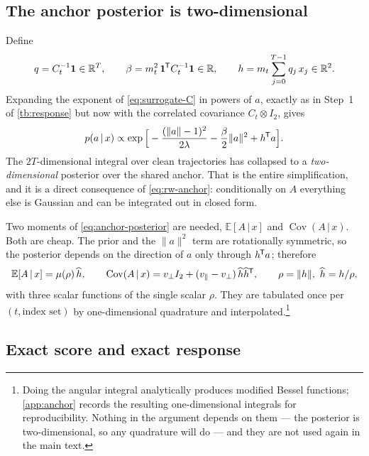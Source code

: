 \documentclass[11pt,a4paper]{article}
\newcommand{\R}{\mathbb{R}}
\newcommand{\E}{\mathbb{E}}
\newcommand{\given}{\,\vert\,}
\newcommand{\mt}{m_t}
\newcommand{\Cov}{\operatorname{Cov}}
\newcommand{\T}{^{\mkern-1.5mu\mathsf{T}}}
\newcommand{\ohat}{\widehat}
\begin{document}
\subsection{The anchor posterior is two-dimensional}\label{sec:anchor-posterior}

Define
\begin{equation}
 q=C_t^{-1}\mathbf1\in\R^T,
 \qquad
 \beta=\mt^2\,\mathbf1\T C_t^{-1}\mathbf1\in\R,
 \qquad
 h=\mt\sum_{j=0}^{T-1}q_j\,x_j\in\R^2 .
 \label{eq:q-beta-h}
\end{equation}
Expanding the exponent of \eqref{eq:surrogate-C} in powers of $a$, exactly as in Step~1 of
\cref{tb:response} but now with the correlated covariance $C_t\otimes I_2$, gives
\begin{equation}
 p(a\given x)\propto
 \exp\Big[-\frac{(\|a\|-1)^2}{2\lambda}-\frac{\beta}{2}\|a\|^2+h\T a\Big] .
 \label{eq:anchor-posterior}
\end{equation}
The $2T$-dimensional integral over clean trajectories has collapsed to a
\emph{two-dimensional} posterior over the shared anchor. That is the entire simplification,
and it is a direct consequence of \eqref{eq:rw-anchor}: conditionally on $A$ everything else
is Gaussian and can be integrated out in closed form.

Two moments of \eqref{eq:anchor-posterior} are needed, $\E[A\given x]$ and
$\Cov(A\given x)$. Both are cheap. The prior and the $\|a\|^2$ term are rotationally
symmetric, so the posterior depends on the direction of $a$ only through $h\T a$; therefore
\begin{equation}
 \E[A\given x]=\mu(\rho)\,\ohat h,
 \qquad
 \Cov(A\given x)=v_\perp I_2+(v_\parallel-v_\perp)\,\ohat h\ohat h\T,
 \qquad \rho=\|h\|,\ \ohat h=h/\rho ,
 \label{eq:anchor-moments}
\end{equation}
with three scalar functions of the single scalar $\rho$. They are tabulated once per
$(t,\text{index set})$ by one-dimensional quadrature and interpolated.\footnote{Doing the
angular integral analytically produces modified Bessel functions; \cref{app:anchor} records
the resulting one-dimensional integrals for reproducibility. Nothing in the argument depends
on them --- the posterior is two-dimensional, so any quadrature will do --- and they are not
used again in the main text.}

\subsection{Exact score and exact response}\label{sec:surrogate-exact}
\end{document}
